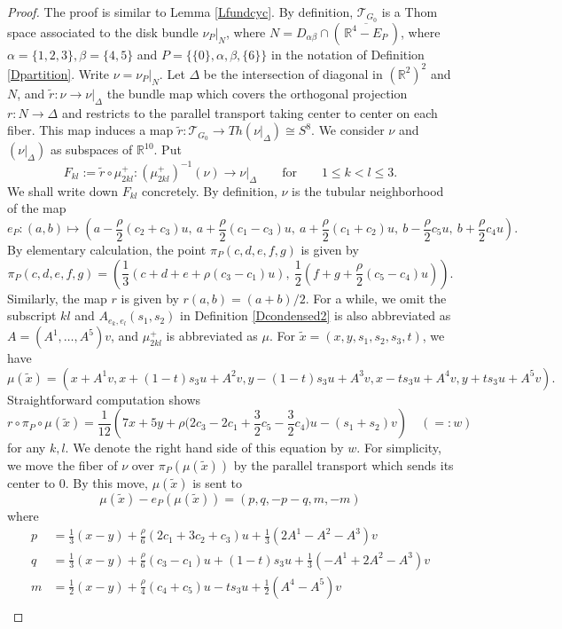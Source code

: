 \documentclass[reqno]{amsart}
\theoremstyle{definition}
\theoremstyle{plain}
\newcommand{\TT}{\mathcal{T}} %
\newcommand{\RR}{\mathbb{R}}
\begin{document}
\begin{proof}
The proof is similar to Lemma \ref{Lfundcyc}. By definition, $\TT_{G_0}$ is a Thom space associated to the disk bundle $\nu_P|_N$, where  $N=D_{\alpha\beta}\cap (\,\overline{\RR^4-E_P}\,)$, where $\alpha=\{1,2,3\}, \beta=\{4,5\}$ and $P=\{\{0\},\alpha,\beta,\{6\}\}$ in the notation of Definition  \ref{Dpartition}.  Write $\nu=\nu_P|_N$. Let $\Delta$ be the intersection of diagonal in $(\RR^2)^2$ and $N$, and  $\tilde r: \nu\to \nu|_{\Delta}$ the bundle map which covers the orthogonal projection $r: N\to \Delta$ and  restricts to the parallel transport taking center to center on each fiber. This map induces a map $\tilde r:\TT_{G_0}\to Th(\nu|_{\Delta})\cong S^8$.  We consider $\nu$ and $(\nu|_\Delta)$ as  subspaces of $\RR^{10}$. Put 
\[
F_{kl}:=\tilde r\circ \mu^{+}_{2kl}:(\mu^+_{2kl})^{-1}(\nu)\to \nu|_{\Delta}\qquad \text{for}\qquad 1\leq k<l\leq 3.
\]
We shall write down $F_{kl}$ concretely. By definition, $\nu$ is the tubular neighborhood of the map
\[
e_P:(a,b)\mapsto \left(a-\frac{\rho}{2}(c_2+c_3)u,\ a+\frac{\rho}{2}(c_1-c_3)u,\ a+\frac{\rho}{2}(c_1+c_2)u,\ b-\frac{\rho}{2}c_5u,\ b+\frac{\rho}{2}c_4u\right).
\]
By elementary calculation, the point $\pi_P(c,d,e,f,g)$ is given by
\[
\pi_P(c,d,e,f,g)=\left(\frac{1}{3}(c+d+e+\rho(c_3-c_1)u),\ \frac{1}{2}(f+g+\frac{\rho}{2}(c_5-c_4)u)\right).
\]
Similarly, the map $r$ is given by $r(a,b)=(a+b)/2$.
For a while, we omit the subscript $kl$  and $A_{e_k,e_l}(s_1,s_2)$ in Definition \ref{Dcondensed2} is also abbreviated as $A=(A^1,\dots, A^5)v$, and  $\mu^+_{2kl}$ is abbreviated as $\mu$.  For $\tilde x=(x,y,s_1,s_2,s_3,t)$, we have 
\[
\mu(\tilde x)=(x+A^1v,x+(1-t)s_3u+A^2v, y-(1-t)s_3u+A^3v,x-ts_3u+A^4v, y+ts_3u+A^5v). 
\] Straightforward computation shows 
\[
r\circ \pi_P\circ \mu(\tilde x)=\frac{1}{12}\left(7x+5y+\rho\bigl(2c_3-2c_1+\frac{3}{2}c_5-\frac{3}{2}c_4\bigr)u-(s_1+s_2)v\right)\quad (=:w)
\] 
for any $k,l$.
We denote the right hand side of this equation by $w$. For simplicity, we move the fiber of $\nu$ over $\pi_P(\mu(\tilde x))$ by the parallel transport which sends its center to $0$. By this move, $\mu(\tilde x)$ is sent to 
\[
\mu(\tilde x)-e_P(\mu(\tilde x))=(p,q,-p-q, m,-m)
\] 
where 
\[
\begin{split}
p &=\frac{1}{3}(x-y)+\frac{\rho}{6}(2c_1+3c_2+c_3)u+\frac{1}{3}(2A^1-A^2-A^3)v\\
q &=\frac{1}{3}(x-y)+\frac{\rho}{6}(c_3-c_1)u+(1-t)s_3u+\frac{1}{3}(-A^1+2A^2-A^3)v\\
m&=\frac{1}{2}(x-y)+\frac{\rho}{4}(c_4+c_5)u-ts_3u+\frac{1}{2}(A^4-A^5)v\\

\end{split}\]
\end{proof}
\end{document}
